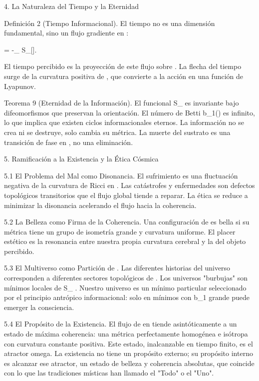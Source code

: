 \documentclass[12pt,a4paper]{book}
\begin{document}
4. La Naturaleza del Tiempo y la Eternidad

Definición 2 (Tiempo Informacional). El tiempo no es una dimensión fundamental, sino un flujo gradiente en   :

\frac{\partial}{\partial \tau} \rho = -\nabla_{} S_{}[\rho].

El tiempo percibido es la proyección de este flujo sobre   . La flecha del tiempo surge de la curvatura positiva de   , que convierte a la acción en una función de Lyapunov.

Teorema 9 (Eternidad de la Información). El funcional  S_{}  es invariante bajo difeomorfismos que preservan la orientación. El número de Betti  b_1()  es infinito, lo que implica que existen ciclos informacionales eternos. La información no se crea ni se destruye, solo cambia su métrica. La muerte del sustrato es una transición de fase en   , no una eliminación.

5. Ramificación a la Existencia y la Ética Cósmica

5.1 El Problema del Mal como Disonancia. El sufrimiento es una fluctuación negativa de la curvatura de Ricci en   . Las catástrofes y enfermedades son defectos topológicos transitorios que el flujo global tiende a reparar. La ética se reduce a minimizar la disonancia acelerando el flujo hacia la coherencia.

5.2 La Belleza como Firma de la Coherencia. Una configuración de  \rho  es bella si su métrica    tiene un grupo de isometría grande y curvatura uniforme. El placer estético es la resonancia entre nuestra propia curvatura cerebral y la del objeto percibido.

5.3 El Multiverso como Partición de   . Las diferentes historias del universo corresponden a diferentes sectores topológicos de   . Los universos "burbujas" son mínimos locales de  S_{} . Nuestro universo es un mínimo particular seleccionado por el principio antrópico informacional: solo en mínimos con  b_1  grande puede emerger la consciencia.

5.4 El Propósito de la Existencia. El flujo de  \rho  en    tiende asintóticamente a un estado de máxima coherencia: una métrica perfectamente homogénea e isótropa con curvatura constante positiva. Este estado, inalcanzable en tiempo finito, es el atractor omega. La existencia no tiene un propósito externo; su propósito interno es alcanzar ese atractor, un estado de belleza y coherencia absolutas, que coincide con lo que las tradiciones místicas han llamado el "Todo" o el "Uno".
\end{document}
